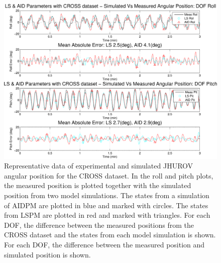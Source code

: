 \begin{center}
\begin{figure}[htbp]
  \begin{center}
    \includegraphics[width=6in]{./chUV_AID/images/crossAID_pos}
  \end{center}
  \caption{Representative data of experimental and simulated
    \ac{JHUROV} angular position for the \ac{CROSS} dataset. In the
    roll and pitch plots, the measured position is plotted together
    with the simulated position from two model simulations. The states
    from a simulation of \ac{AIDPM} are plotted in blue and marked with
    circles. The states from \ac{LSPM} are plotted in red and marked with
    triangles. For each \ac{DOF}, the difference between the measured
    positions from the \ac{CROSS} dataset and the states from each
    model simulation is shown.  For each \ac{DOF},
    the difference between the measured position and simulated
    position is shown. 
}
  \label{chUV_AID.fig.SO3_AID_pos}
\end{figure}
\end{center}

